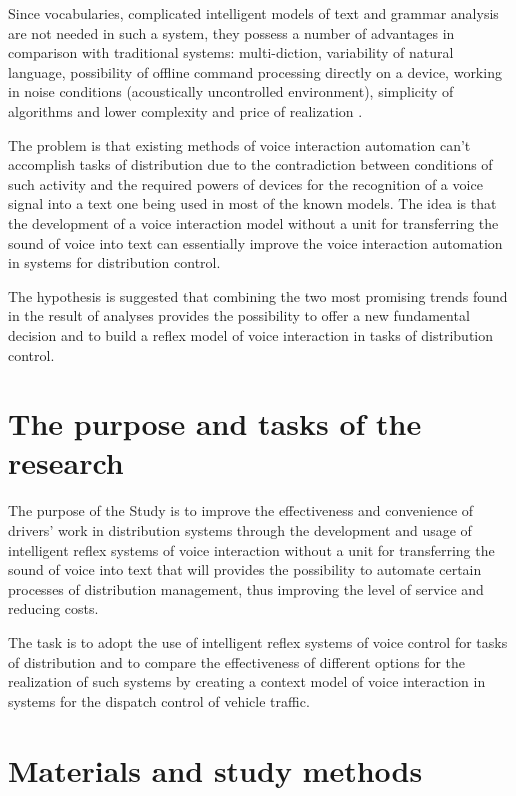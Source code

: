 Since vocabularies, complicated intelligent models of text and grammar analysis are not needed in such a system, they possess a number of advantages in comparison with traditional systems: multi-diction, variability of natural language, possibility of offline command processing directly on a device, working in noise conditions (acoustically uncontrolled environment), simplicity of algorithms and lower complexity and price of realization \cite{Teslia_2013}. 

The problem is that existing methods of voice interaction automation can’t accomplish tasks of distribution due to the contradiction between conditions of such activity and the required powers of devices for the recognition of a voice signal into a text one being used in most of the known models. The idea is that the development of a voice interaction model without a unit for transferring the sound of voice into text can essentially improve the voice interaction automation in systems for distribution control. 

The hypothesis is suggested that combining the two most promising trends found in the result of analyses provides the possibility to offer a new fundamental decision and to build a reflex model of voice interaction in tasks of distribution control. 

\section{The purpose and tasks of the research}

The purpose of the Study is to improve the effectiveness and convenience of drivers’ work in distribution systems through the development and usage of intelligent reflex systems of voice interaction without a unit for transferring the sound of voice into text that will provides the possibility to automate certain processes of distribution management, thus improving the level of service and reducing costs.

The task is to adopt the use of intelligent reflex systems of voice control for tasks of distribution and to compare the effectiveness of different options for the realization of such systems by creating a context model of voice interaction in systems for the dispatch control of vehicle traffic. 

\section{Materials and study methods}

